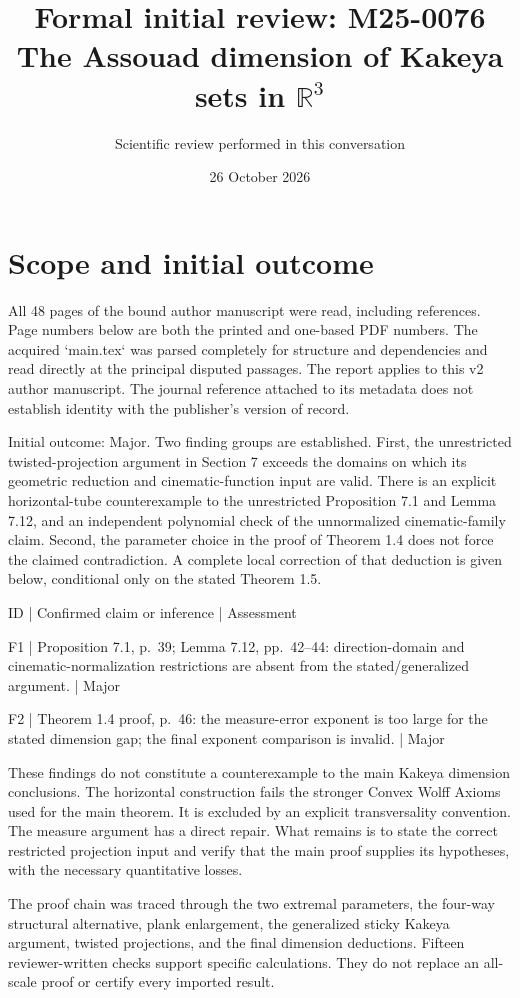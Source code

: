 \documentclass[10pt]{article}
\title{Formal initial review: M25-0076
The Assouad dimension of Kakeya sets in \(\mathbb R^3\)}
\author{Scientific review performed in this conversation}
\date{26 October 2026}
\begin{document}
\maketitle
\section*{Scope and initial outcome}
All 48 pages of the bound author manuscript were read, including references. Page numbers below are both the printed and one-based PDF numbers. The acquired `main.tex` was parsed completely for structure and dependencies and read directly at the principal disputed passages. The report applies to this v2 author manuscript. The journal reference attached to its metadata does not establish identity with the publisher’s version of record.\par
Initial outcome: Major. Two finding groups are established. First, the unrestricted twisted-projection argument in Section 7 exceeds the domains on which its geometric reduction and cinematic-function input are valid. There is an explicit horizontal-tube counterexample to the unrestricted Proposition 7.1 and Lemma 7.12, and an independent polynomial check of the unnormalized cinematic-family claim. Second, the parameter choice in the proof of Theorem 1.4 does not force the claimed contradiction. A complete local correction of that deduction is given below, conditional only on the stated Theorem 1.5.\par
ID | Confirmed claim or inference | Assessment\par
F1 | Proposition 7.1, p. 39; Lemma 7.12, pp. 42–44: direction-domain and cinematic-normalization restrictions are absent from the stated/generalized argument. | Major\par
F2 | Theorem 1.4 proof, p. 46: the measure-error exponent is too large for the stated dimension gap; the final exponent comparison is invalid. | Major\par
These findings do not constitute a counterexample to the main Kakeya dimension conclusions. The horizontal construction fails the stronger Convex Wolff Axioms used for the main theorem. It is excluded by an explicit transversality convention. The measure argument has a direct repair. What remains is to state the correct restricted projection input and verify that the main proof supplies its hypotheses, with the necessary quantitative losses.\par
The proof chain was traced through the two extremal parameters, the four-way structural alternative, plank enlargement, the generalized sticky Kakeya argument, twisted projections, and the final dimension deductions. Fifteen reviewer-written checks support specific calculations. They do not replace an all-scale proof or certify every imported result.\par
\end{document}
